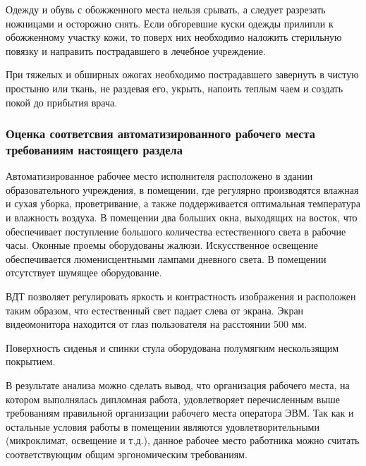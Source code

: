 Одежду и обувь с обожженного места нельзя срывать, а следует разрезать ножницами и осторожно снять. 
Если обгоревшие куски одежды прилипли к обожженному участку кожи, то поверх них необходимо наложить 
стерильную повязку и направить пострадавшего в лечебное учреждение.

При тяжелых и обширных ожогах необходимо пострадавшего завернуть в чистую простыню или ткань, 
не раздевая его, укрыть, напоить теплым чаем и создать покой до прибытия врача.

\subsubsection{Оценка соответсвия автоматизированного рабочего места требованиям настоящего раздела}

Автоматизированное рабочее место исполнителя расположено в здании образовательного учреждения,
в помещении, где регулярно производятся влажная и сухая уборка, проветривание, а также поддерживается
оптимальная температура и влажность воздуха. В помещении два больших окна, выходящих на восток,
что обеспечивает поступление большого количества естественного света в рабочие часы.
Оконные проемы оборудованы жалюзи. Искусственное освещение обеспечивается люменисцентными лампами
дневного света. В помещении отсутствует шумящее оборудование.

ВДТ позволяет регулировать яркость и контрастность изображения и расположен таким образом, что 
естественный свет падает слева от экрана. Экран видеомонитора 
находится от глаз пользователя на расстоянии 500 мм.

Поверхность сиденья и спинки стула оборудована полумягким нескользящим покрытием.

В результате анализа можно сделать вывод, что организация рабочего места, на котором 
выполнялась дипломная работа, удовлетворяет перечисленным выше
требованиям правильной организации рабочего места оператора ЭВМ. Так как
и остальные условия работы в помещении являются удовлетворительными 
(микроклимат, освещение и т.д.), данное рабочее место работника можно считать соответствующим 
общим эргономическим требованиям.
